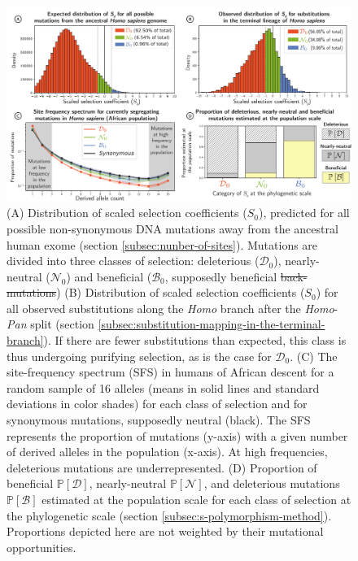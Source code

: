 \documentclass{article}
\newcommand{\proba}{\mathbb{P}}
\newcommand{\Sphy}{S_{0}}
\newcommand{\SphyDel}{\mathcal{D}_0}
\newcommand{\SphyNeu}{\mathcal{N}_0}
\newcommand{\SphyBen}{\mathcal{B}_0}
\newcommand{\SpopDel}{\mathcal{D}}
\newcommand{\SpopNeu}{\mathcal{N}}
\newcommand{\SpopBen}{\mathcal{B}}
\newcommand{\ProbaPopDel}{\proba [ \SpopDel]}
\newcommand{\ProbaPopNeu}{\proba [ \SpopNeu ]}
\newcommand{\ProbaPopBen}{\proba [ \SpopBen ]}
\providecommand{\DIFaddtex}[1]{{\protect\color{blue}\uwave{#1}}} %
\providecommand{\DIFdeltex}[1]{{\protect\color{red}\sout{#1}}}                      %
\providecommand{\DIFaddFL}[1]{\DIFadd{#1}} %
\providecommand{\DIFdelFL}[1]{\DIFdel{#1}} %
\providecommand{\DIFaddbeginFL}{} %
\providecommand{\DIFaddendFL}{} %
\providecommand{\DIFdelbeginFL}{} %
\providecommand{\DIFdelendFL}{} %
\providecommand{\DIFadd}[1]{\texorpdfstring{\DIFaddtex{#1}}{#1}} %
\providecommand{\DIFdel}[1]{\texorpdfstring{\DIFdeltex{#1}}{}} %
\newcommand{\DIFscaledelfig}{0.5}
\newlength{\DIFdelgraphicswidth} %
\newlength{\DIFdelgraphicsheight} %
\newcommand{\DIFaddincludegraphics}[2][]{{\color{blue}\fbox{\DIFOincludegraphics[#1]{#2}}}} %
\newcommand{\DIFdelincludegraphics}[2][]{%
\sbox{\DIFdelgraphicsbox}{\DIFOincludegraphics[#1]{#2}}%
\settoboxwidth{\DIFdelgraphicswidth}{\DIFdelgraphicsbox} %
\settoboxtotalheight{\DIFdelgraphicsheight}{\DIFdelgraphicsbox} %
\scalebox{\DIFscaledelfig}{%
\parbox[b]{\DIFdelgraphicswidth}{\usebox{\DIFdelgraphicsbox}\\[-\baselineskip] \rule{\DIFdelgraphicswidth}{0em}}\llap{\resizebox{\DIFdelgraphicswidth}{\DIFdelgraphicsheight}{%
\setlength{\unitlength}{\DIFdelgraphicswidth}%
\begin{picture}(1,1)%
\thicklines\linethickness{2pt} %
{\color[rgb]{1,0,0}\put(0,0){\framebox(1,1){}}}%
{\color[rgb]{1,0,0}\put(0,0){\line( 1,1){1}}}%
{\color[rgb]{1,0,0}\put(0,1){\line(1,-1){1}}}%
\end{picture}%
}\hspace*{3pt}}} %
} %
\DeclareRobustCommand{\DIFaddbeginFL}{\DIFOaddbeginFL \let\includegraphics\DIFaddincludegraphics} %
\DeclareRobustCommand{\DIFaddendFL}{\DIFOaddendFL \let\includegraphics\DIFOincludegraphics} %
\DeclareRobustCommand{\DIFdelbeginFL}{\DIFOdelbeginFL \let\includegraphics\DIFdelincludegraphics} %
\DeclareRobustCommand{\DIFdelendFL}{\DIFOaddendFL \let\includegraphics\DIFOincludegraphics} %
\begin{document}
    \begin{figure}[!h]
        \centering
        \includegraphics[width=\textwidth, page=1] {artworks/figure.homo-afr-results}
        \caption{
            (A) Distribution of scaled selection coefficients ($\Sphy$), predicted for all possible non-synonymous DNA mutations away from the ancestral human exome (section \ref{subsec:nunber-of-sites}).
            Mutations are divided into three classes of selection: deleterious ($\SphyDel$), nearly-neutral ($\SphyNeu$) and beneficial ($\SphyBen$, supposedly beneficial \DIFdelbeginFL \DIFdelFL{back-mutations}\DIFdelendFL \DIFaddbeginFL \DIFaddFL{non-adaptive mutations}\DIFaddendFL )
            (B) Distribution of scaled selection coefficients ($\Sphy$) for all observed substitutions along the \textit{Homo} branch after the \textit{Homo}-\textit{Pan} split (section \ref{subsec:substitution-mapping-in-the-terminal-branch}).
            If there are fewer substitutions than expected, this class is thus undergoing purifying selection, as is the case for $\SphyDel$.
            (C) The site-frequency spectrum (SFS) in humans of African descent for a random sample of 16 alleles (means in solid lines and standard deviations in color shades) for each class of selection and for synonymous mutations, supposedly neutral (black). The SFS represents the proportion of mutations (y-axis) with a given number of derived alleles in the population (x-axis).
            At high frequencies, deleterious mutations are underrepresented.
            (D) Proportion of beneficial $\ProbaPopDel$, nearly-neutral $\ProbaPopNeu$, and deleterious mutations $\ProbaPopBen$ estimated at the population scale for each class of selection at the phylogenetic scale (section \ref{subsec:s-polymorphism-method}). Proportions depicted here are not weighted by their mutational opportunities.
        }
        \label{fig:homo-afr-results}
    \end{figure}
\end{document}
